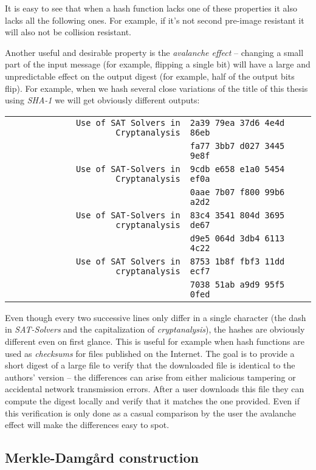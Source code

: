 It is easy to see that when a hash function lacks one of these properties it also lacks all the following ones.
For example, if it's not second pre-image resistant it will also not be collision resistant.

Another useful and desirable property is the \emph{avalanche effect} \citep{katz2007introduction} -- changing a small part of the input message (for example, flipping a single bit) will have a large and unpredictable effect on the output digest (for example, half of the output bits flip).
For example, when we hash several close variations of the title of this thesis using \emph{SHA-1} we will get obviously different outputs:

\begin{tabular}{r l}
\texttt{Use of SAT Solvers in Cryptanalysis} & \texttt{2a39 79ea 37d6 4e4d 86eb} \\
& \texttt{fa77 3bb7 d027 3445 9e8f} \\
\texttt{Use of SAT-Solvers in Cryptanalysis} & \texttt{9cdb e658 e1a0 5454 ef0a}\\
& \texttt{0aae 7b07 f800 99b6 a2d2} \\
\texttt{Use of SAT-Solvers in cryptanalysis} & \texttt{83c4 3541 804d 3695 de67}\\
& \texttt{d9e5 064d 3db4 6113 4c22} \\
\texttt{Use of SAT Solvers in cryptanalysis} & \texttt{8753 1b8f fbf3 11dd ecf7} \\
& \texttt{7038 51ab a9d9 95f5 0fed}
\end{tabular}

Even though every two successive lines only differ in a single character (the dash in \emph{SAT-Solvers} and the capitalization of \emph{cryptanalysis}), the hashes are obviously different even on first glance.
This is useful for example when hash functions are used as \emph{checksums} for files published on the Internet.
The goal is to provide a short digest of a large file to verify that the downloaded file is identical to the authors' version -- the differences can arise from either malicious tampering or accidental network transmission errors.
After a user downloads this file they can compute the digest locally and verify that it matches the one provided.
Even if this verification is only done as a casual comparison by the user the avalanche effect will make the differences easy to spot.

\subsection{Merkle-Damg\aa rd construction}

